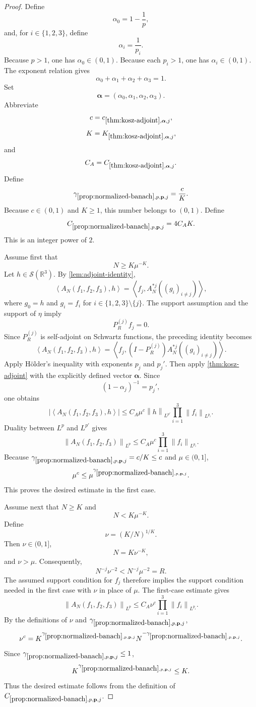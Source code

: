 \documentclass[11pt]{article}
\newcommand{\R}{\mathbb{R}}
\newcommand{\Sch}{\mathcal{S}}
\newcommand{\ip}[2]{\left\langle #1,#2\right\rangle}
\newcommand{\norm}[2]{\left\lVert #1\right\rVert_{#2}}
\newcommand{\Cst}[2]{C_{\ref{#1},#2}}
\newcommand{\Gam}[2]{\gamma_{\ref{#1},#2}}
\newcommand{\Thr}[2]{K_{\ref{#1},#2}}
\newcommand{\abs}[1]{\left|#1\right|}
\newcommand{\indices}{\{1,2,3\}}
\begin{document}
\begin{proof}
Define
\[
\alpha_0=1-\frac1p,
\]
and, for \(i\in\indices\), define
\[
\alpha_i=\frac1{p_i}.
\]
Because \(p>1\), one has \(\alpha_0\in(0,1)\).  Because each \(p_i>1\), one has \(\alpha_i\in(0,1)\).  The exponent relation gives
\[
\alpha_0+\alpha_1+\alpha_2+\alpha_3=1.
\]
Set
\[
\boldsymbol\alpha=(\alpha_0,\alpha_1,\alpha_2,\alpha_3).
\]
Abbreviate
\[
c=c_{\ref{thm:kosz-adjoint},\boldsymbol\alpha,j},
\]
\[
K=\Thr{thm:kosz-adjoint}{\boldsymbol\alpha,j},
\]
and
\[
C_A=\Cst{thm:kosz-adjoint}{\boldsymbol\alpha,j}.
\]
Define
\[
\Gam{prop:normalized-banach}{p,\mathbf p,j}=\frac cK.
\]
Because \(c\in(0,1)\) and \(K\geq1\), this number belongs to \((0,1)\).  Define
\[
\Cst{prop:normalized-banach}{p,\mathbf p,j}
=
4C_AK.
\]
This is an integer power of \(2\).

Assume first that
\[
N\geq K\mu^{-K}.
\]
Let \(h\in\Sch(\R^3)\).  By \cref{lem:adjoint-identity},
\[
\ip{A_N(f_1,f_2,f_3)}{h}
=
\ip{f_j}{A_N^{*j}((g_i)_{i\neq j})},
\]
where \(g_0=h\) and \(g_i=f_i\) for \(i\in\indices\setminus\{j\}\).  The support assumption and the support of \(\eta\) imply
\[
P_R^{(j)}f_j=0.
\]
Since \(P_R^{(j)}\) is self-adjoint on Schwartz functions, the preceding identity becomes
\[
\ip{A_N(f_1,f_2,f_3)}{h}
=
\ip{f_j}{(I-P_R^{(j)})A_N^{*j}((g_i)_{i\neq j})}.
\]
Apply H\"older's inequality with exponents \(p_j\) and \(p_j'\).  Then apply \cref{thm:kosz-adjoint} with the explicitly defined vector \(\boldsymbol\alpha\).  Since
\[
(1-\alpha_j)^{-1}=p_j',
\]
one obtains
\[
\abs{\ip{A_N(f_1,f_2,f_3)}{h}}
\leq
C_A\mu^c
\norm{h}{L^{p'}}
\prod_{i=1}^{3}\norm{f_i}{L^{p_i}}.
\]
Duality between \(L^p\) and \(L^{p'}\) gives
\[
\norm{A_N(f_1,f_2,f_3)}{L^p}
\leq
C_A\mu^c
\prod_{i=1}^{3}\norm{f_i}{L^{p_i}}.
\]
Because \(\Gam{prop:normalized-banach}{p,\mathbf p,j}=c/K\leq c\) and \(\mu\in(0,1]\),
\[
\mu^c\leq\mu^{\Gam{prop:normalized-banach}{p,\mathbf p,j}}.
\]
This proves the desired estimate in the first case.

Assume next that \(N\geq K\) and
\[
N<K\mu^{-K}.
\]
Define
\[
\nu=(K/N)^{1/K}.
\]
Then \(\nu\in(0,1]\),
\[
N=K\nu^{-K},
\]
and \(\nu>\mu\).  Consequently,
\[
N^{-j}\nu^{-2}<N^{-j}\mu^{-2}=R.
\]
The assumed support condition for \(f_j\) therefore implies the support condition needed in the first case with \(\nu\) in place of \(\mu\).  The first-case estimate gives
\[
\norm{A_N(f_1,f_2,f_3)}{L^p}
\leq
C_A\nu^c
\prod_{i=1}^{3}\norm{f_i}{L^{p_i}}.
\]
By the definitions of \(\nu\) and \(\Gam{prop:normalized-banach}{p,\mathbf p,j}\),
\[
\nu^c=K^{\Gam{prop:normalized-banach}{p,\mathbf p,j}}
N^{-\Gam{prop:normalized-banach}{p,\mathbf p,j}}.
\]
Since \(\Gam{prop:normalized-banach}{p,\mathbf p,j}\leq1\),
\[
K^{\Gam{prop:normalized-banach}{p,\mathbf p,j}}\leq K.
\]
Thus the desired estimate follows from the definition of \(\Cst{prop:normalized-banach}{p,\mathbf p,j}\).


\end{proof}
\end{document}
